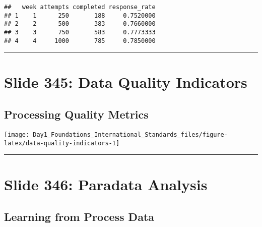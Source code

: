\documentclass[
]{article}
\begin{document}
\begin{verbatim}
##   week attempts completed response_rate
## 1    1      250       188     0.7520000
## 2    2      500       383     0.7660000
## 3    3      750       583     0.7773333
## 4    4     1000       785     0.7850000
\end{verbatim}

\begin{center}\rule{0.5\linewidth}{0.5pt}\end{center}

\section{Slide 345: Data Quality
Indicators}\label{slide-345-data-quality-indicators}

\subsection{Processing Quality
Metrics}\label{processing-quality-metrics}

\texttt{[image: Day1\_Foundations\_International\_Standards\_files/figure-latex/data-quality-indicators-1]}

\begin{center}\rule{0.5\linewidth}{0.5pt}\end{center}

\section{Slide 346: Paradata
Analysis}\label{slide-346-paradata-analysis}

\subsection{Learning from Process
Data}\label{learning-from-process-data}
\end{document}

